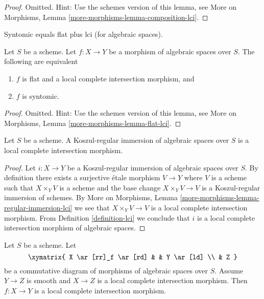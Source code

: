 \begin{proof}
Omitted. Hint: Use the schemes version of this lemma, see
More on Morphisms,
Lemma \ref{more-morphisms-lemma-composition-lci}.
\end{proof}

\begin{lemma}
\label{lemma-flat-lci}
\begin{slogan}
Syntomic equals flat plus lci (for algebraic spaces).
\end{slogan}
Let $S$ be a scheme.
Let $f : X \to Y$ be a morphism of algebraic spaces over $S$.
The following are equivalent
\begin{enumerate}
\item $f$ is flat and a local complete intersection morphism, and
\item $f$ is syntomic.
\end{enumerate}
\end{lemma}

\begin{proof}
Omitted. Hint: Use the schemes version of this lemma, see
More on Morphisms,
Lemma \ref{more-morphisms-lemma-flat-lci}.
\end{proof}

\begin{lemma}
\label{lemma-regular-immersion-lci}
Let $S$ be a scheme. A Koszul-regular immersion of algebraic spaces
over $S$ is a local complete intersection morphism.
\end{lemma}

\begin{proof}
Let $i : X \to Y$ be a Koszul-regular immersion of algebraic spaces
over $S$. By definition there exists a surjective \'etale morphism
$V \to Y$ where $V$ is a scheme such that $X \times_Y V$ is a scheme
and the base change $X \times_Y V \to V$ is a Koszul-regular immersion of
schemes. By More on Morphisms, Lemma
\ref{more-morphisms-lemma-regular-immersion-lci} we see that
$X \times_Y V \to V$ is a local complete intersection morphism.
From Definition \ref{definition-lci} we conclude that $i$ is a
local complete intersection morphism of algebraic spaces.
\end{proof}

\begin{lemma}
\label{lemma-lci-permanence}
Let $S$ be a scheme. Let
$$
\xymatrix{
X \ar[rr]_f \ar[rd] & & Y \ar[ld] \\
& Z
}
$$
be a commutative diagram of morphisms of algebraic spaces over $S$.
Assume $Y \to Z$ is smooth and $X \to Z$ is a
local complete intersection morphism.
Then $f : X \to Y$ is a local complete intersection morphism.
\end{lemma}

